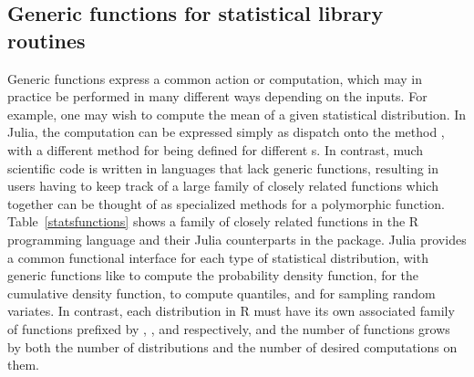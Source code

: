 \documentclass[pldi]{sigplanconf-pldi15}
\begin{document}
\subsection{Generic functions for statistical library routines}

Generic functions express a common action or computation, which may in
practice be performed in many different ways depending on the inputs. For
example, one may wish to compute the mean of a given statistical distribution.
In Julia, the computation can be expressed simply as dispatch onto the method
, with a different method for  being
defined for different s. In contrast, much scientific code
is written in languages that lack generic functions, resulting in users having
to keep track of a large family of closely related functions which
together can be thought of as specialized methods for a polymorphic function.
Table~\ref{statsfunctions} shows a family of closely related functions in the R
programming language and their Julia counterparts in the
 package. Julia provides a common functional interface
for each type of statistical distribution, with generic functions like
 to compute the probability density function,  for the
cumulative density function,  to compute quantiles, and
 for sampling random variates. In contrast, each distribution in R
must have its own associated family of functions prefixed by ,
,  and  respectively, and the number of functions grows
by both the number of distributions and the number of desired computations on
them.

\end{document}
